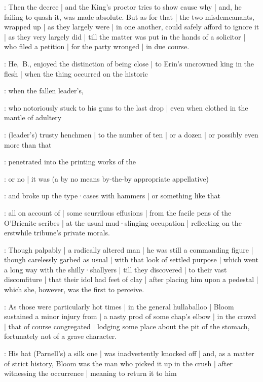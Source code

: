 :
Then the decree  |
and the King's proctor tries to show cause why |
and,
he failing to quash it,
 was made absolute.
But as for that |
the two misdemeanants,
wrapped up |
as they largely were |
in one another,
could safely afford to ignore it |
as they very largely did |
till the matter was put in the hands of a solicitor |
who filed a petition |
for the party wronged |
in due course.

:
He,~B.,
enjoyed the distinction of being close |
to Erin's uncrowned king in the flesh |
when the thing occurred on the historic 

:
when the fallen leader's,

:
who notoriously stuck to his guns to the last drop |
even when clothed in the mantle of adultery

:
(leader's) trusty henchmen |
to the number of ten |
or a dozen |
or possibly even more than that

:
penetrated into the printing works of the %

:
or no |
it was 
(a by no means by-the-by appropriate appellative)

:
and broke up the type·cases with hammers |
or something like that

:
all on account of |
some scurrilous effusions |
from the facile pens of the O'Brienite scribes |
at the usual mud·slinging occupation |
reflecting on the erstwhile tribune's private morals.

:
Though palpably |
a radically altered man |
he was still a commanding figure |
though carelessly garbed as usual |
with that look of settled purpose |
which went a long way with the shilly·shallyers |
till they discovered |
to their vast discomfiture |
that their idol had feet of clay |
after placing him upon a pedestal |
which she,
however,
was the first to perceive.

:
As those were particularly hot times |
in the general hullaballoo |%
Bloom sustained a minor injury from |
a nasty prod of some chap's elbow |
in the crowd |
that of course congregated |
lodging some place about the pit of the stomach,
fortunately not of a grave character.

:
His hat (Parnell's)
a silk one |
was inadvertently knocked off |
and,
as a matter of strict history,
Bloom was the man who picked it up in the crush |
after witnessing the occurrence |
meaning to return it to him

